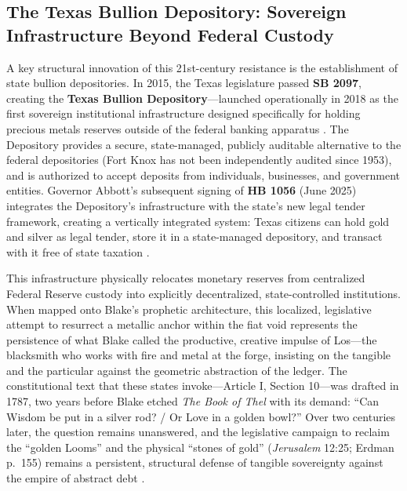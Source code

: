 \documentclass[
]{article}
\begin{document}
\subsection{The Texas Bullion Depository: Sovereign Infrastructure
Beyond Federal
Custody}\label{the-texas-bullion-depository-sovereign-infrastructure-beyond-federal-custody}

A key structural innovation of this 21st-century resistance is the
establishment of state bullion depositories. In 2015, the Texas
legislature passed \textbf{SB 2097}, creating the \textbf{Texas Bullion
Depository}---launched operationally in 2018 as the first sovereign
institutional infrastructure designed specifically for holding precious
metals reserves outside of the federal banking apparatus
\citep{texas2015depository}. The Depository provides a secure,
state-managed, publicly auditable alternative to the federal
depositories (Fort Knox has not been independently audited since 1953),
and is authorized to accept deposits from individuals, businesses, and
government entities. Governor Abbott's subsequent signing of \textbf{HB
1056} (June 2025) integrates the Depository's infrastructure with the
state's new legal tender framework, creating a vertically integrated
system: Texas citizens can hold gold and silver as legal tender, store
it in a state-managed depository, and transact with it free of state
taxation \citep{texas2025legaltender}.

This infrastructure physically relocates monetary reserves from
centralized Federal Reserve custody into explicitly decentralized,
state-controlled institutions. When mapped onto Blake's prophetic
architecture, this localized, legislative attempt to resurrect a
metallic anchor within the fiat void represents the persistence of what
Blake called the productive, creative impulse of Los---the blacksmith
who works with fire and metal at the forge, insisting on the tangible
and the particular against the geometric abstraction of the ledger. The
constitutional text that these states invoke---Article I, Section
10---was drafted in 1787, two years before Blake etched \emph{The Book
of Thel} with its demand: ``Can Wisdom be put in a silver rod? / Or Love
in a golden bowl?'' Over two centuries later, the question remains
unanswered, and the legislative campaign to reclaim the ``golden Looms''
and the physical ``stones of gold'' (\emph{Jerusalem} 12:25; Erdman
p.~155) remains a persistent, structural defense of tangible sovereignty
against the empire of abstract debt \citep{erdman1988complete}.
\end{document}
